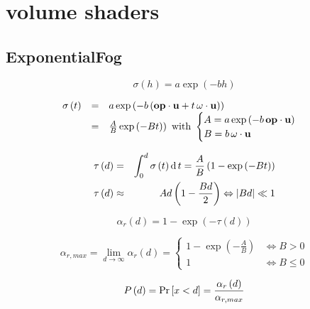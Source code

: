 \section{volume shaders}

\subsection{ExponentialFog}\label{shaders.ExponentialFog}

\begin{equation}
	\sigma \left( h \right) = a \exp \left( -bh \right)
\end{equation}

\begin{equation}
	\begin{array}{lcl}
		\sigma \left( t \right) &=& a \exp \left( -b \left( \mathbf{op} \cdot \mathbf{u} + t \, \mathbf{\omega} \cdot \mathbf{u} \right) \right)\\
		&=& \frac A B \exp \left( -B t ) \right) 
			\text{ with } \begin{cases}
				A = a \exp \left( -b \, \mathbf{op} \cdot \mathbf{u} \right)\\
				B = b \, \mathbf{\omega} \cdot \mathbf{u}
			\end{cases}
	\end{array}
\end{equation}

\begin{eqnarray}
	\tau \left( d \right) &=& \int_0^d \sigma \left( t \right) \operatorname{d} t = \frac A B \left( 1 - \exp \left( -B t \right) \right)\\
	\tau \left( d \right) &\approx& A d \left(1 - \frac{B d} 2\right) \Leftrightarrow \left|{B d}\right| \ll 1
\end{eqnarray}

\begin{equation}
	\alpha_r \left( d \right) = 1 - \exp \left( -\tau \left( d \right) \right)
\end{equation}

\begin{equation}
	\alpha_{r,max} = \lim_{d \rightarrow \infty} \alpha_r \left( d \right) = 
		\begin{cases}
			1 - \exp \left( -\frac A B \right) & \Leftrightarrow B > 0\\
			1 & \Leftrightarrow B \leq 0
		\end{cases}
\end{equation}

\begin{equation}
	P \left(d\right) = \Pr\left[x < d\right] = \frac {\alpha_r \left( d \right)} {\alpha_{r,max}}
\end{equation}

